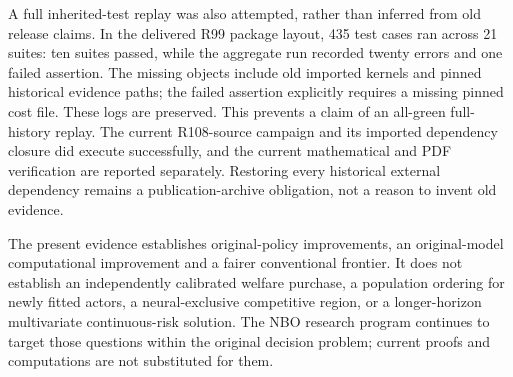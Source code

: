 A full inherited-test replay was also attempted, rather than inferred from old release claims. In the delivered R99 package layout, 435 test cases ran across 21 suites: ten suites passed, while the aggregate run recorded twenty errors and one failed assertion. The missing objects include old imported kernels and pinned historical evidence paths; the failed assertion explicitly requires a missing pinned cost file. These logs are preserved. This prevents a claim of an all-green full-history replay. The current R108-source campaign and its imported dependency closure did execute successfully, and the current mathematical and PDF verification are reported separately. Restoring every historical external dependency remains a publication-archive obligation, not a reason to invent old evidence.

The present evidence establishes original-policy improvements, an original-model computational improvement and a fairer conventional frontier. It does not establish an independently calibrated welfare purchase, a population ordering for newly fitted actors, a neural-exclusive competitive region, or a longer-horizon multivariate continuous-risk solution. The NBO research program continues to target those questions within the original decision problem; current proofs and computations are not substituted for them.
